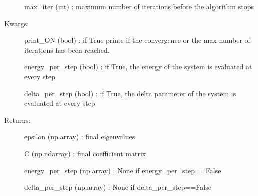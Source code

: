 \documentclass[letterpaper,10pt,english]{sphinxmanual}
\begin{document}
\begin{fulllineitems}
\begin{fulllineitems}
\begin{description}
max\_iter (int) : maximum number of iterations before the algorithm stops

\item[{Kwargs:}] \leavevmode
print\_ON (bool) : if True prints if the convergence or the max number of iterations has been reached.

energy\_per\_step (bool) : if True, the energy of the system is evaluated at every step

delta\_per\_step (bool) : if True, the delta parameter of the system is evaluated at every step

\item[{Returns:}] \leavevmode
epsilon (np.array) : final eigenvalues

C (np.ndarray) : final coefficient matrix

energy\_per\_step (np.array) : None if energy\_per\_step==False

delta\_per\_step (np.array) : None if delta\_per\_step==False

\end{description}

\end{fulllineitems}


\end{fulllineitems}

\end{document}
